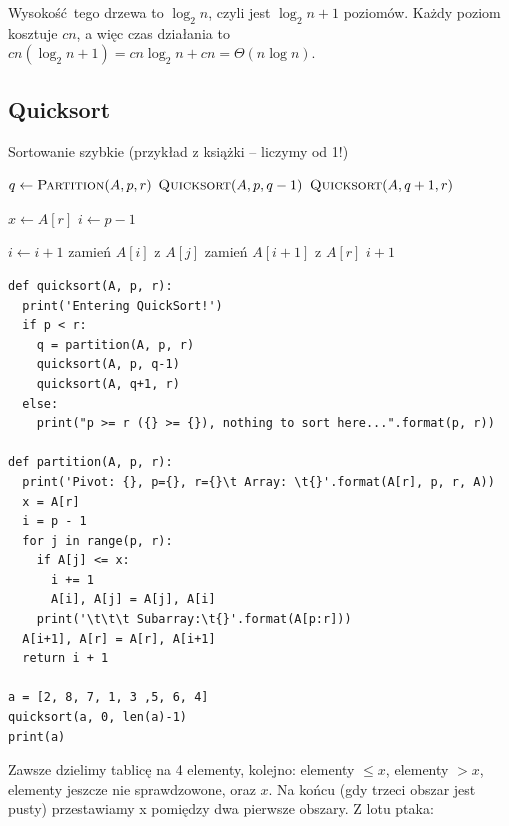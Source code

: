 \documentclass[10pt, oneside]{article}
\theoremstyle{remark}
\newcommand{\algcost}[2]{\strut\hfill\makebox[1.5cm][l]{#1}\makebox[4cm][l]{#2}}
\begin{document}
Wysokość tego drzewa to $\log_2 n$, czyli jest $\log_2 n + 1 $ poziomów.
Każdy poziom kosztuje $cn$, a więc czas działania to $cn(\log_2 n + 1) = cn \log_2 n + cn = \Theta(n \log n)$.


\subsection{Quicksort}
\begin{algorithm}
    \caption{Sortowanie szybkie (przykład z książki -- liczymy od 1!)}
    \label{alg:quicksort}
    \begin{algorithmic}[1] %
            		\State $q \gets \Call{Partition}{A, p, r}$
            		\State $\Call{Quicksort}{A, p, q-1}$
            		\State $\Call{Quicksort}{A, q+1, r}$
            	\EndIf
        \EndFunction
        
        	 \algcost{}{$\Theta(n)$}
            	\State $x \gets A[r]$
            	\State $i \gets p - 1$
            	 \algcost{$c$}{$n=r-p+1$}
	            		\State $i \gets i +1$ 
	            		\State zamień $A[i]$ z $A[j]$
	            	\EndIf
            	\EndFor
            	\State zamień $A[i+1]$ z $A[r]$
            	\Return $i +1$
        \EndFunction
    \end{algorithmic}
\end{algorithm}

\begin{verbatim}
def quicksort(A, p, r):
  print('Entering QuickSort!')
  if p < r:
    q = partition(A, p, r)
    quicksort(A, p, q-1)
    quicksort(A, q+1, r)
  else:
    print("p >= r ({} >= {}), nothing to sort here...".format(p, r))
    
def partition(A, p, r):
  print('Pivot: {}, p={}, r={}\t Array: \t{}'.format(A[r], p, r, A))
  x = A[r]
  i = p - 1
  for j in range(p, r):
    if A[j] <= x:
      i += 1
      A[i], A[j] = A[j], A[i]
    print('\t\t\t Subarray:\t{}'.format(A[p:r]))
  A[i+1], A[r] = A[r], A[i+1]
  return i + 1
  
a = [2, 8, 7, 1, 3 ,5, 6, 4]
quicksort(a, 0, len(a)-1)
print(a)	
\end{verbatim}

Zawsze dzielimy tablicę na 4 elementy, kolejno: elementy $\leq x$, elementy $> x$, elementy jeszcze nie sprawdzowone, oraz $x$.
Na końcu (gdy trzeci obszar jest pusty) przestawiamy x pomiędzy dwa pierwsze obszary.
Z lotu ptaka:
\end{document}
